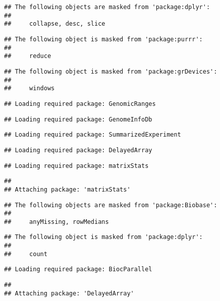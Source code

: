 \documentclass[]{article}
\begin{document}
\begin{verbatim}
## The following objects are masked from 'package:dplyr':
## 
##     collapse, desc, slice
\end{verbatim}

\begin{verbatim}
## The following object is masked from 'package:purrr':
## 
##     reduce
\end{verbatim}

\begin{verbatim}
## The following object is masked from 'package:grDevices':
## 
##     windows
\end{verbatim}

\begin{verbatim}
## Loading required package: GenomicRanges
\end{verbatim}

\begin{verbatim}
## Loading required package: GenomeInfoDb
\end{verbatim}

\begin{verbatim}
## Loading required package: SummarizedExperiment
\end{verbatim}

\begin{verbatim}
## Loading required package: DelayedArray
\end{verbatim}

\begin{verbatim}
## Loading required package: matrixStats
\end{verbatim}

\begin{verbatim}
## 
## Attaching package: 'matrixStats'
\end{verbatim}

\begin{verbatim}
## The following objects are masked from 'package:Biobase':
## 
##     anyMissing, rowMedians
\end{verbatim}

\begin{verbatim}
## The following object is masked from 'package:dplyr':
## 
##     count
\end{verbatim}

\begin{verbatim}
## Loading required package: BiocParallel
\end{verbatim}

\begin{verbatim}
## 
## Attaching package: 'DelayedArray'
\end{verbatim}
\end{document}
